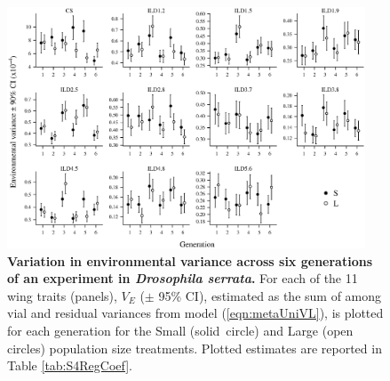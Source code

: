 \begin{figure}
    \centering
    \includegraphics[width=0.95\textwidth]{Supp/Chp2_Meta/S4.Ve.eps}
    \caption[Variation in environmental variance across six generations of an experiment in \textit{Drosophila serrata}.]{\textbf{Variation in environmental variance across six generations of an experiment in \textit{Drosophila serrata}.} For each of the 11 wing traits (panels), $V_E$ ($\pm$ 95\% CI), estimated as the sum of among vial and residual variances from model (\ref{eqn:metaUniVL}), is plotted for each generation for the Small (solid~circle) and Large (open circles) population size treatments. Plotted estimates are reported in Table \ref{tab:S4RegCoef}.}
    \label{fig:S4Ve}
\end{figure}

